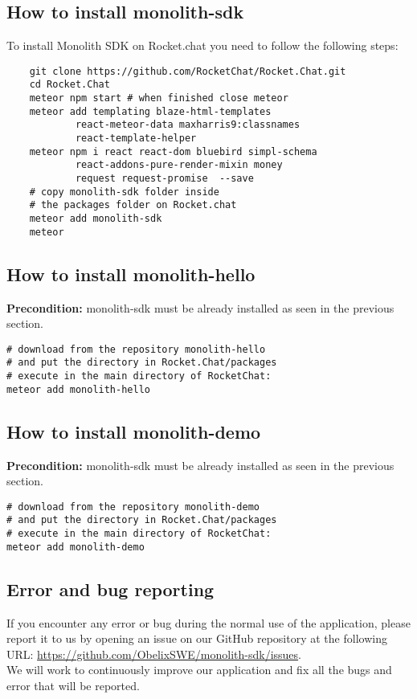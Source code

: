 \subsection{How to install monolith-sdk}
To install Monolith SDK on Rocket.chat you need to follow the following steps:

\begin{lstlisting}
    git clone https://github.com/RocketChat/Rocket.Chat.git
    cd Rocket.Chat
    meteor npm start # when finished close meteor
    meteor add templating blaze-html-templates
    		react-meteor-data maxharris9:classnames
    		react-template-helper	
    meteor npm i react react-dom bluebird simpl-schema
    		react-addons-pure-render-mixin money
    		request request-promise  --save
    # copy monolith-sdk folder inside
    # the packages folder on Rocket.chat
    meteor add monolith-sdk
    meteor
\end{lstlisting}

\subsection{How to install monolith-hello}
\textbf{Precondition:} monolith-sdk must be already installed as seen in the previous section.

\begin{lstlisting}
# download from the repository monolith-hello
# and put the directory in Rocket.Chat/packages
# execute in the main directory of RocketChat:
meteor add monolith-hello
\end{lstlisting}

\subsection{How to install monolith-demo}
\textbf{Precondition:} monolith-sdk must be already installed as seen in the previous section.

\begin{lstlisting}
# download from the repository monolith-demo 
# and put the directory in Rocket.Chat/packages
# execute in the main directory of RocketChat:
meteor add monolith-demo
\end{lstlisting}




\subsection{Error and bug reporting}
If you encounter any error or bug during the normal use of the
application, please report it to us by opening an issue on our GitHub
repository at the following URL:
\url{https://github.com/ObelixSWE/monolith-sdk/issues}. \\ 
We will work to continuously improve our application and fix all the bugs and error that will be reported. 

